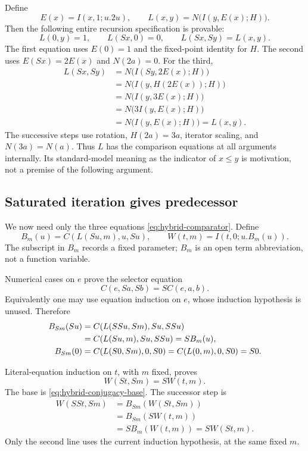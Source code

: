 \documentclass[11pt,a4paper]{article}
\theoremstyle{definition}\newtheorem{definition}[theorem]{Definition}
\begin{document}
Define
\[
 E(x)=I(x,1;u.2u),\qquad
 L(x,y)=N\bigl(I(y,E(x);H)\bigr).
\]
Then the following entire recursion specification is provable:
\begin{equation}
 L(0,y)=1,\qquad L(Sx,0)=0,\qquad L(Sx,Sy)=L(x,y).
 \label{eq:hybrid-comparator}
\end{equation}
The first equation uses $E(0)=1$ and the fixed-point identity for
$H$.  The second uses $E(Sx)=2E(x)$ and $N(2a)=0$.
For the third,
\begin{align*}
 L(Sx,Sy)
 &=N\bigl(I(Sy,2E(x);H)\bigr)\\
 &=N\bigl(I(y,H(2E(x));H)\bigr)\\
 &=N\bigl(I(y,3E(x);H)\bigr)\\
 &=N\bigl(3I(y,E(x);H)\bigr)\\
 &=N\bigl(I(y,E(x);H)\bigr)=L(x,y).
\end{align*}
The successive steps use rotation, $H(2a)=3a$, iterator scaling,
and $N(3a)=N(a)$.  Thus $L$ has the comparison equations at all
arguments internally.  Its standard-model meaning as the indicator
of $x\le y$ is motivation, not a premise of the following argument.

\subsection{Saturated iteration gives predecessor}

We now need only the three equations
\eqref{eq:hybrid-comparator}.  Define
\[
 B_m(u)=C(L(Su,m),u,Su),\qquad
 W(t,m)=I(t,0;u.B_m(u)).
\]
The subscript in $B_m$ records a fixed parameter; $B_m$ is an open
term abbreviation, not a function variable.

Numerical cases on $e$ prove the selector equation
\[
 C(e,Sa,Sb)=S C(e,a,b).
\]
Equivalently one may use equation induction on $e$, whose induction
hypothesis is unused.  Therefore
\begin{align}
 B_{Sm}(Su)
 &=C(L(SSu,Sm),Su,SSu)\notag\\
 &=C(L(Su,m),Su,SSu)=S B_m(u),
 \label{eq:hybrid-conjugacy}\\
 B_{Sm}(0)&=C(L(S0,Sm),0,S0)=C(L(0,m),0,S0)=S0.
 \label{eq:hybrid-conjugacy-base}
\end{align}

Literal-equation induction on $t$, with $m$ fixed, proves
\begin{equation}
 W(St,Sm)=S W(t,m).
 \label{eq:hybrid-saturated-shift}
\end{equation}
The base is \eqref{eq:hybrid-conjugacy-base}.  The successor step is
\begin{align*}
 W(SSt,Sm)
 &=B_{Sm}(W(St,Sm))\\
 &=B_{Sm}(S W(t,m))\\
 &=S B_m(W(t,m))=S W(St,m).
\end{align*}
Only the second line uses the current induction hypothesis, at the
same fixed $m$.
\end{document}
